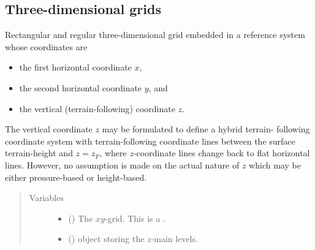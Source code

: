 \documentclass[letterpaper,10pt,english]{sphinxmanual}
\begin{document}
\subsection{Three-dimensional grids}
\label{\detokenize{api:three-dimensional-grids}}

\begin{fulllineitems}
\label{\detokenize{api:grids.xyz_grid.XYZGrid}}
Rectangular and regular three-dimensional grid embedded in a reference system whose
coordinates are
\begin{itemize}
\item {} 
the first horizontal coordinate \(x\),

\item {} 
the second horizontal coordinate \(y\), and

\item {} 
the vertical (terrain-following) coordinate \(z\).

\end{itemize}

The vertical coordinate \(z\) may be formulated to define a hybrid terrain-
following coordinate system with terrain-following coordinate lines between the
surface terrain-height and \(z = z_F\), where \(z\)-coordinate lines change
back to flat horizontal lines. However, no assumption is made on the actual nature
of \(z\) which may be either pressure-based or height-based.
\begin{quote}\begin{description}
\item[{Variables}] \leavevmode\begin{itemize}
\item {} 
 () \textendash{} The \(xy\)-grid. This is a {\hyperref[\detokenize{api:grids.xy_grid.XYGrid}]{}}.

\item {} 
 () \textendash{} {\hyperref[\detokenize{api:grids.axis.Axis}]{}} object storing the \(z\)-main levels.


\end{itemize}
\end{description}
\end{quote}
\end{fulllineitems}
\end{document}
